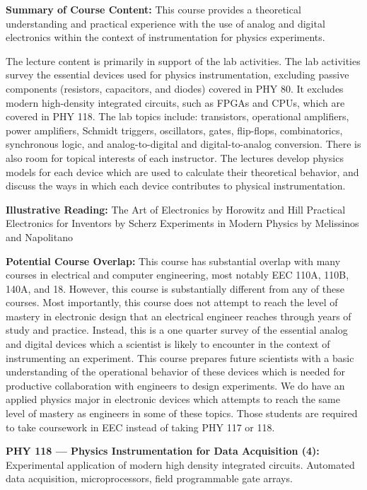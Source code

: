 \documentclass[12pt]{article}
\begin{document}
{\bf Summary of Course Content:}
This course provides a theoretical understanding and practical
experience with the use of analog and digital electronics within the
context of instrumentation for physics experiments.

The lecture content is primarily in support of the lab activities.
The lab activities survey the essential devices used for physics
instrumentation, excluding passive components (resistors, capacitors,
and diodes) covered in PHY 80.  It excludes modern high-density
integrated circuits, such as FPGAs and CPUs, which are covered in PHY
118.  The lab topics include: transistors, operational amplifiers,
power amplifiers, Schmidt triggers, oscillators, gates, flip-flops,
combinatorics, synchronous logic, and analog-to-digital and
digital-to-analog conversion.  There is also room for topical
interests of each instructor.  The lectures develop physics models for
each device which are used to calculate their theoretical behavior,
and discuss the ways in which each device contributes to physical
instrumentation.

{\bf Illustrative Reading:}
The Art of Electronics by Horowitz and Hill
Practical Electronics for Inventors by Scherz
Experiments in Modern Physics by Melissinos and Napolitano

{\bf Potential Course Overlap:} This course has substantial overlap
with many courses in electrical and computer engineering, most notably
EEC 110A, 110B, 140A, and 18.  However, this course is substantially
different from any of these courses.  Most importantly, this course
does not attempt to reach the level of mastery in electronic design
that an electrical engineer reaches through years of study and
practice.  Instead, this is a one quarter survey of the essential
analog and digital devices which a scientist is likely to encounter in
the context of instrumenting an experiment.  This course prepares
future scientists with a basic understanding of the operational
behavior of these devices which is needed for productive collaboration
with engineers to design experiments.  We do have an applied physics
major in electronic devices which attempts to reach the same level of
mastery as engineers in some of these topics.  Those students are
required to take coursework in EEC instead of taking PHY 117 or 118.



\vskip 1cm
\noindent 
{\bf PHY 118 --- Physics Instrumentation for Data Acquisition (4):}  
Experimental application of modern high density integrated circuits.
Automated data acquisition,  microprocessors, field programmable gate arrays.
\end{document}
